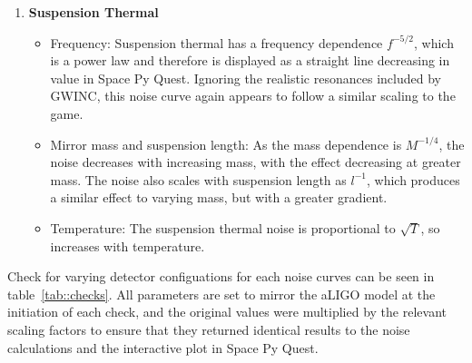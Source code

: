 \documentclass{article}
\begin{document}
\begin{enumerate}
    \item \textbf{Suspension Thermal}
    \begin{itemize}
   \item Frequency: Suspension thermal has a frequency dependence
     $f^{-5/2}$, which is a power law and therefore is displayed as a
     straight line decreasing in value in Space Py Quest. Ignoring the
     realistic resonances included by GWINC, this noise curve again
     appears to follow a similar scaling to the game. 
   \item Mirror mass and suspension length: As the mass dependence is
     $M^{-1/4}$, the noise decreases with increasing mass, with the
     effect decreasing at greater mass. The noise also scales with
     suspension length as $l^{-1}$, which produces a similar effect to
     varying mass, but with a greater gradient. 
   \item Temperature: The suspension thermal noise is proportional to
     $\sqrt{T}$, so increases with temperature. 
 \end{itemize}
\end{enumerate}
Check for varying detector configuations for each noise curves can be
seen in table~\ref{tab::checks}. All parameters are set to mirror the
aLIGO model at the initiation of each check, and the original values
were multiplied by the relevant scaling factors to ensure that they
returned identical results to the noise calculations and the
interactive plot in Space Py Quest. 
\end{document}
